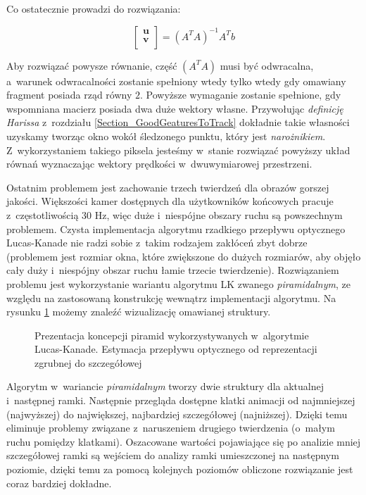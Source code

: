     Co ostatecznie prowadzi do rozwiązania:

    \[
      \begin{bmatrix}
        \mathbf{u} \\
        \mathbf{v} \\
      \end{bmatrix} = (A^{T}A)^{-1} A^{T}b
    \]

    Aby rozwiązać powysze równanie, część $(A^{T}A)$ musi być odwracalna, a~warunek odwracalności zostanie spełniony wtedy tylko wtedy gdy omawiany fragment posiada rząd równy $2$. Powyższe wymaganie zostanie spełnione, gdy wspomniana macierz posiada dwa duże wektory własne. Przywołując \textit{definicję Harissa} z~rozdziału \ref{Section_GoodGeaturesToTrack} dokładnie takie własności uzyskamy tworząc okno wokół śledzonego punktu, który jest \textit{narożnikiem}. Z~wykorzystaniem takiego piksela jesteśmy w~stanie rozwiązać powyższy układ równań wyznaczając wektory prędkości w~dwuwymiarowej przestrzeni.

    Ostatnim problemem jest zachowanie trzech twierdzeń dla obrazów gorszej jakości. Większości kamer dostępnych dla użytkowników końcowych pracuje z~częstotliwością 30 Hz, więc duże i~niespójne obszary ruchu są powszechnym problemem. Czysta implementacja algorytmu rzadkiego przepływu optycznego Lucas-Kanade nie radzi sobie z~takim rodzajem zakłóceń zbyt dobrze (problemem jest rozmiar okna, które zwiększone do dużych rozmiarów, aby objęło cały duży i~niespójny obszar ruchu łamie trzecie twierdzenie). Rozwiązaniem problemu jest wykorzystanie wariantu algorytmu LK zwanego \textit{piramidalnym}, ze względu na zastosowaną konstrukcję wewnątrz implementacji algorytmu. Na rysunku \ref{fig:OpticalFlowPyramids} możemy znaleźć wizualizację omawianej struktury.

    \begin{figure}[!ht]
      \centering
      \caption[Prezentacja koncepcji piramid wykorzystywanych w~algorytmie Lucas-Kanade]{Prezentacja koncepcji piramid wykorzystywanych w~algorytmie Lucas-Kanade. Estymacja przepływu optycznego od reprezentacji zgrubnej do szczegółowej}
      \label{fig:OpticalFlowPyramids}
    \end{figure}

    Algorytm w~wariancie \textit{piramidalnym} tworzy dwie struktury dla aktualnej i~następnej ramki. Następnie przegląda dostępne klatki animacji od najmniejszej (najwyższej) do największej, najbardziej szczegółowej (najniższej). Dzięki temu eliminuje problemy związane z~naruszeniem drugiego twierdzenia (o~małym ruchu pomiędzy klatkami). Oszacowane wartości pojawiające się po analizie mniej szczegółowej ramki są wejściem do analizy ramki umieszczonej na następnym poziomie, dzięki temu za pomocą kolejnych poziomów obliczone rozwiązanie jest coraz bardziej dokładne.

